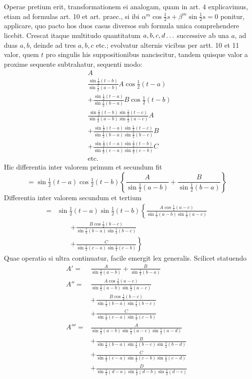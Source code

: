 Operae pretium erit, transformationem ei analogam, quam in art. 4 explicavimus,
etiam ad formulas art. 10 et art. praec., si ibi $\alpha^m\cos\tfrac12s+\beta^m\sin\tfrac12s=0$
ponitur, applicare, quo pacto hos duos casus diversos sub formula unica comprehendere licebit.
Crescat itaque multitudo quantitatum $a,b,c,d\mathinner{.\,.\,.}$ successive
ab una $a$, ad duas $a,b$, deinde ad tres $a,b,c$ etc.; evolvatur alternis vicibus
per artt. 10 et 11 valor, quem $t$ pro singulis his suppositionibus nanciscitur, tandem
quisque valor a proxime sequente subtrahatur, sequenti modo:
\[
\begin{aligned}
&A\\[5pt]
&\frac{\sin\tfrac12(t-b)}{\sin\tfrac12(a-b)}A\cos\tfrac12(t-a)\\[5pt]
&+\frac{\sin\tfrac12(t-a)}{\sin\tfrac12(b-a)}B\cos\tfrac12(t-b)\\[5pt]
&\frac{\sin\tfrac12(t-b)\sin\tfrac12(t-c)}{\sin\tfrac12(a-b)\sin\tfrac12(a-c)}A\\[5pt]
&+\frac{\sin\tfrac12(t-a)\sin\tfrac12(t-c)}{\sin\tfrac12(b-a)\sin\tfrac12(b-c)}B\\[5pt]
&+\frac{\sin\tfrac12(t-a)\sin\tfrac12(t-b)}{\sin\tfrac12(c-a)\sin\tfrac12(c-b)}C\\[5pt]
&\text{etc.}
\end{aligned}
\]
Hic differentia inter valorem primum et secundum fit
\[
=\sin\tfrac12(t-a)\cos\tfrac12(t-b)
\left\{\frac{A}{\sin\tfrac12(a-b)}+\frac{B}{\sin\tfrac12(b-a)}\right\}
\]
Differentia inter valorem secundum et tertium
\[
\begin{aligned}
={}&\sin\tfrac12(t-a)\sin\tfrac12(t-b)\left\{
\frac{A\cos\tfrac12(a-c)}{\sin\tfrac12(a-b)\sin\tfrac12(a-c)}\right.\\[5pt]&\qquad\left.
+\frac{B\cos\tfrac12(b-c)}{\sin\tfrac12(b-a)\sin\tfrac12(b-c)}\right.\\[5pt]&\qquad\left.
+\frac{C}{\sin\tfrac12(c-a)\sin\tfrac12(c-b)}\right\}
\end{aligned}
\]
Quae operatio si ultra continuatur, facile emergit lex generalis. Scilicet statuendo
\[
\begin{aligned}
A'={}&\frac{A}{\sin\tfrac12(a-b)}+\frac{B}{\sin\tfrac12(b-a)}\\[5pt]
A''={}&\frac{A\cos\tfrac12(a-c)}{\sin\tfrac12(a-b)\sin\tfrac12(a-c)}\\[5pt]
&+\frac{B\cos\tfrac12(b-c)}{\sin\tfrac12(b-a)\sin\tfrac12(b-c)}\\[5pt]
&+\frac{C}{\sin\tfrac12(c-a)\sin\tfrac12(c-b)}\\[5pt]
A'''={}&\frac{A}{\sin\tfrac12(a-b)\sin\tfrac12(a-c)\sin\tfrac12(a-d)}\\[5pt]
&+\frac{B}{\sin\tfrac12(b-a)\sin\tfrac12(b-c)\sin\tfrac12(b-d)}\\[5pt]
&+\frac{C}{\sin\tfrac12(c-a)\sin\tfrac12(c-b)\sin\tfrac12(c-d)}\\[5pt]
&+\frac{D}{\sin\tfrac12(d-a)\sin\tfrac12(d-b)\sin\tfrac12(d-c)}\\[5pt]
\end{aligned}\]
